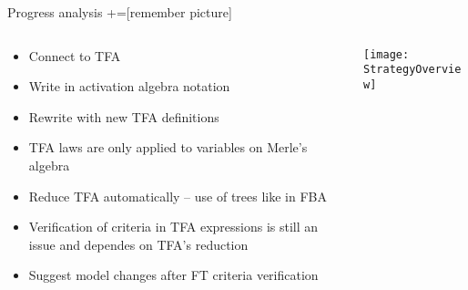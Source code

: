 \begin{frame}{Progress analysis}
+=[remember picture]
\begin{columns}
    \begin{column}{0.45\paperwidth}
        \begin{itemize}
          \item<1-> Connect to TFA
          \item<2-> Write in activation algebra notation
          \item<3-> Rewrite with new TFA definitions
          \item<4-> TFA laws are only applied to variables on Merle's algebra
          \item<5-> Reduce TFA automatically -- use of trees like in FBA
          \item<6-> Verification of criteria in TFA expressions is still an issue and dependes on TFA's reduction
          \item<7-> Suggest model changes after FT criteria verification
        \end{itemize}
    \end{column}
    \begin{column}{0.45\paperwidth}
        \texttt{[image: StrategyOverview]}
    \end{column}
\end{columns}


\end{frame}

